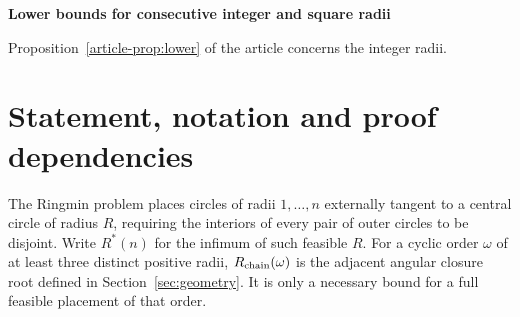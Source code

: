 \documentclass[review,supplement,hidelinks,onefignum,onetabnum]{siamart251216}
\newcommand{\Rstar}{R^*}
\newcommand{\Cterm}{C_{\rm term}}
\newcommand{\etaw}{\eta_{\rm width}}
\newcommand{\Rc}{R_{\rm chain}}
\begin{document}
\maketitle
\begin{center}
\textbf{Lower bounds for consecutive integer and square radii}

Proposition~\ref{article-prop:lower} of the article concerns the integer radii.
\end{center}
\begin{abstract}
We give a self-contained proof of the explicit lower bound
$C_*\ge\Cterm+\etaw$ for the asymptotic central-circle constant of
Ringmin. Three nested terminal deletions of one cyclic order share one
quadratic energy. An explicit dual potential, signed deletion estimate,
crossing lemma, scalar minimax and global cubic certificate yield the bound.
All constants and directed rational checks are specified here and in two
small included arithmetic scripts. In particular,
\[
0.14056946887766098063257<\Cterm+\etaw
<0.14056946887766098063392.
\]
The coefficient is a lower bound, not an identified geometric optimum.
This supplement reconstructs Proposition 7 of arXiv:2609.13630 and does
not revise that manuscript or assert external scientific acceptance.
An additional argument for square radii gives the lower bound
$(434+4\sqrt2)/(1587\pi)$ for their cubic growth coefficient.
\end{abstract}

\section{Statement, notation and proof dependencies}\label{sec:statement}
The Ringmin problem places circles of radii $1,\ldots,n$ externally
tangent to a central circle of radius $R$, requiring the interiors of
every pair of outer circles to be disjoint. Write $\Rstar(n)$ for the
infimum of such feasible $R$. For a cyclic order $\omega$ of at least
three distinct positive radii, $\Rc(\omega)$ is the adjacent angular
closure root defined in Section~\ref{sec:geometry}. It is only a necessary
bound for a full feasible placement of that order.
\end{document}
